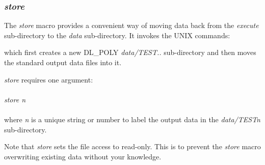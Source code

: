\subsubsection*{{\sl store}}

The {\sl store} macro provides a convenient way of moving data back
from the {\em execute} sub-directory to the
{\em data} sub-directory.  It invokes the UNIX commands:



\noindent which first creates a new DL\_POLY {\em data/TEST..}
sub-directory and then moves the standard \D
output data files into it.

{\sl store} requires one argument:\\
\\
{\sl store n}\\
\\
\noindent where {\sl n} is a unique string or number to label the
output data in the {\em data/TESTn} sub-directory.

Note that {\sl store} sets the file access to read-only.  This is
to prevent the {\sl store} macro overwriting existing data without
your knowledge.
